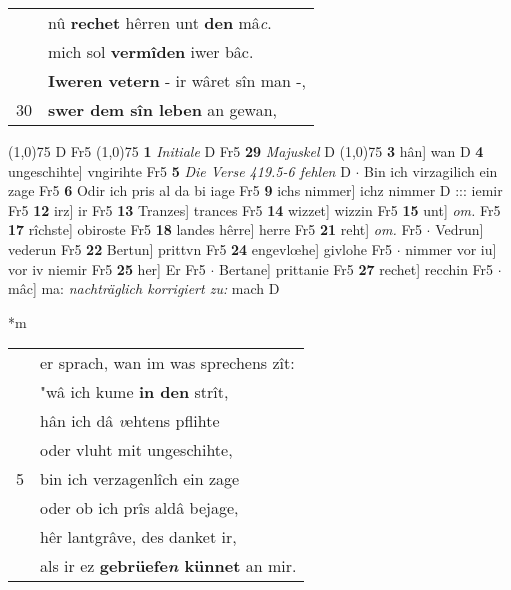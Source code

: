 \documentclass[8pt,a4paper,notitlepage]{article}
\begin{document}
\begin{table}[ht]
\begin{minipage}[t]{0.5\linewidth}
\begin{tabular}{rl}
 & nû \textbf{rechet} hêrren unt \textbf{den} mâ\textit{c}.\\ 
 & mich sol \textbf{vermîden} iwer bâc.\\ 
 & \textbf{Iweren vetern} - ir wâret sîn man -,\\ 
30 & \textbf{swer dem sîn leben} an gewan,\\ 
\end{tabular}
\scriptsize
\line(1,0){75} \newline
D Fr5 \newline
\line(1,0){75} \newline
\textbf{1} \textit{Initiale} D Fr5  \textbf{29} \textit{Majuskel} D  \newline
\line(1,0){75} \newline
\textbf{3} hân] wan D \textbf{4} ungeschihte] vngirihte Fr5 \textbf{5} \textit{Die Verse 419.5-6 fehlen} D   $\cdot$ Bin ich virzagilich ein zage Fr5 \textbf{6} Odir ich pris al da bi iage Fr5 \textbf{9} ichs nimmer] ichz nimmer D ::: iemir Fr5 \textbf{12} irz] ir Fr5 \textbf{13} Tranzes] trances Fr5 \textbf{14} wizzet] wizzin Fr5 \textbf{15} unt] \textit{om.} Fr5 \textbf{17} rîchste] obiroste Fr5 \textbf{18} landes hêrre] herre Fr5 \textbf{21} reht] \textit{om.} Fr5  $\cdot$ Vedrun] vederun Fr5 \textbf{22} Bertun] prittvn Fr5 \textbf{24} engevlœhe] givlohe Fr5  $\cdot$ nimmer vor iu] vor iv niemir Fr5 \textbf{25} her] Er Fr5  $\cdot$ Bertane] prittanie Fr5 \textbf{27} rechet] recchin Fr5  $\cdot$ mâc] ma: \textit{nachträglich korrigiert zu:} mach D \newline
\end{minipage}
\hspace{0.5cm}
\begin{minipage}[t]{0.5\linewidth}
\small
\begin{center}*m
\end{center}
\begin{tabular}{rl}
 & er sprach, wan im was sprechens zît:\\ 
 & "wâ ich kume \textbf{in den} strît,\\ 
 & hân ich dâ \textit{v}ehtens pflihte\\ 
 & oder vluht mit ungeschihte,\\ 
5 & bin ich verzagenlîch ein zage\\ 
 & oder ob ich prîs aldâ bejage,\\ 
 & hêr lantgrâve, des danket ir,\\ 
 & als ir ez \textbf{gebrüefe\textit{n} künnet} an mir.\\ 

\end{tabular}
\end{minipage}
\end{table}
\end{document}
